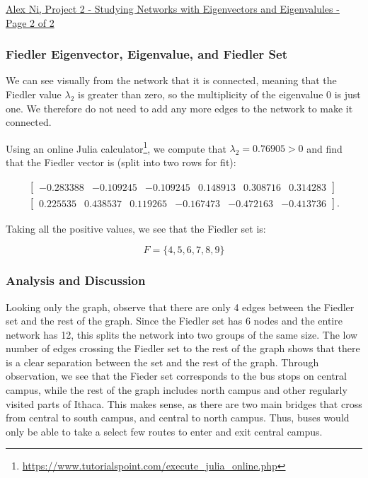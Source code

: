 \documentclass[letterpaper,12pt]{article}
\begin{document}
\clearpage

\begin{center} \underline{    Alex Ni, Project 2 - Studying Networks with Eigenvectors and Eigenvalules - Page 2 of 2    }

\end{center}

\subsubsection*{Fiedler Eigenvector, Eigenvalue, and Fiedler Set}
We can see visually from the network that it is connected, meaning that the Fiedler value $\lambda_{2}$ is greater than zero, so the multiplicity of the eigenvalue 0 is just one. We therefore do not need to add any more edges to the network to make it connected.

\noindent Using an online Julia calculator\footnote{\href{https://www.tutorialspoint.com/execute\_julia\_online.php}{https://www.tutorialspoint.com/execute\_julia\_online.php}}, we compute that $\lambda_{2} = 0.76905 > 0$ and find that the Fiedler vector is (split into two rows for fit):

\begin{align*}
\begin{bmatrix} -0.283388 & -0.109245 & -0.109245 & 0.148913 & 0.308716 & 0.314283 \end{bmatrix} \\
\begin{bmatrix} 0.225535 & 0.438537 & 0.119265 & -0.167473 & -0.472163 & -0.413736 \end{bmatrix}.
\end{align*}

\noindent Taking all the positive values, we see that the Fiedler set is:

$$F = \{4, 5, 6, 7, 8, 9\}$$


\subsubsection*{Analysis and Discussion}

\noindent Looking only the graph, observe that there are only 4 edges between the Fiedler set and the rest of the graph. Since the Fiedler set has 6 nodes and the entire network has 12, this splits the network into two groups of the same size. The low number of edges crossing the Fiedler set to the rest of the graph shows that there is a clear separation between the set and the rest of the graph. Through observation, we see that the Fieder set corresponds to the bus stops on central campus, while the rest of the graph includes north campus and other regularly visited parts of Ithaca. This makes sense, as there are two main bridges that cross from central to south campus, and central to north campus. Thus, buses would only be able to take a select few routes to enter and exit central campus. \\
\end{document}
